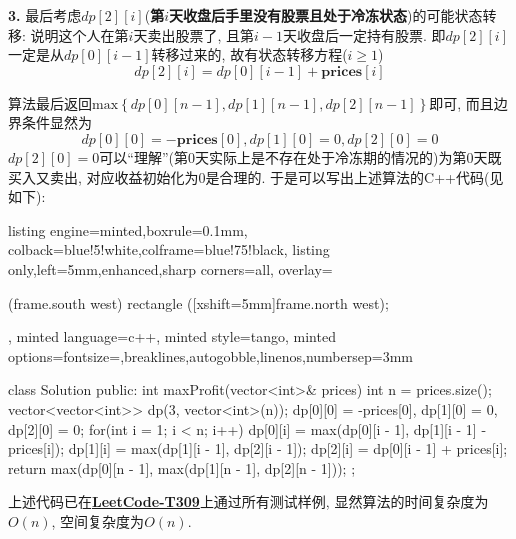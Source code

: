\documentclass{article}
\begin{document}
\begin{homeworkProblem}
	\textbf{3.} 最后考虑$dp[2][i]$(\textbf{第$i$天收盘后手里没有股票且处于冷冻状态})的可能状态转移: 说明这个人在第$i$天卖出股票了, 且第$i-1$天收盘后一定持有股票. 即$dp[2][i]$一定是从$dp[0][i-1]$转移过来的, 故有状态转移方程($i\geq 1$)
	$$
	dp\left[ 2 \right] \left[ i \right] =dp\left[ 0 \right] \left[ i-1 \right] +\textbf{prices}\left[ i \right] 
	$$

	算法最后返回$\text{max} \left\{ dp\left[ 0 \right] \left[ n-1 \right] ,dp\left[ 1 \right] \left[ n-1 \right] ,dp\left[ 2 \right] \left[ n-1 \right] \right\}$即可, 而且边界条件显然为
	$$
	dp\left[ 0 \right] \left[ 0 \right] =-\textbf{prices}\left[ 0 \right] , dp\left[ 1 \right] \left[ 0 \right] =0, dp\left[ 2 \right] \left[ 0 \right] =0
	$$
	$dp[2][0]=0$可以“理解”(第0天实际上是不存在处于冷冻期的情况的)为第0天既买入又卖出, 对应收益初始化为0是合理的. 于是可以写出上述算法的C++代码(见如下):
\begin{tcblisting}{listing engine=minted,boxrule=0.1mm,
colback=blue!5!white,colframe=blue!75!black,
listing only,left=5mm,enhanced,sharp corners=all,
overlay={\begin{tcbclipinterior} (frame.south west)
rectangle ([xshift=5mm]frame.north west);\end{tcbclipinterior}},
minted language=c++,
minted style=tango,
minted options={fontsize=\small,breaklines,autogobble,linenos,numbersep=3mm}}
class Solution {
public:
    int maxProfit(vector<int>& prices) {
        int n = prices.size();
        vector<vector<int>> dp(3, vector<int>(n));
        dp[0][0] = -prices[0], dp[1][0] = 0, dp[2][0] = 0;
        for(int i = 1; i < n; i++) {
            dp[0][i] = max(dp[0][i - 1], dp[1][i - 1] - prices[i]);
            dp[1][i] = max(dp[1][i - 1], dp[2][i - 1]);
            dp[2][i] = dp[0][i - 1] + prices[i];
        }
        return max(dp[0][n - 1], max(dp[1][n - 1], dp[2][n - 1]));
    }
};
\end{tcblisting}
	上述代码已在\href{https://leetcode.cn/problems/best-time-to-buy-and-sell-stock-with-cooldown/}{\textbf{LeetCode-T309}}上通过所有测试样例, 显然算法的时间复杂度为$O(n)$, 空间复杂度为$O(n)$.
\end{homeworkProblem}

\pagebreak
\end{document}
